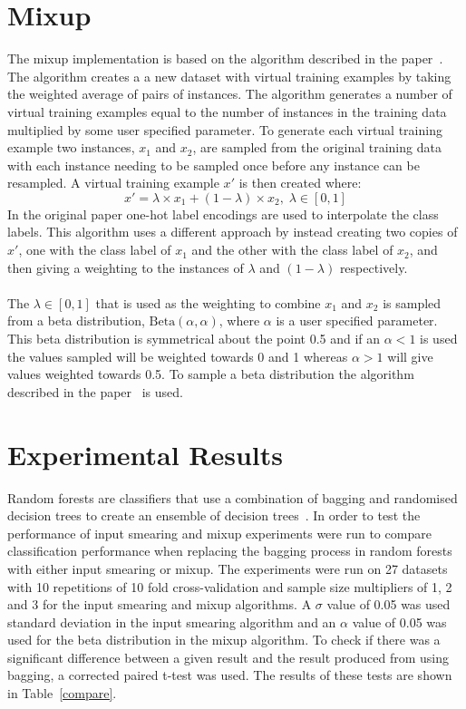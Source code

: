 \documentclass{article}
\begin{document}
\section{Mixup}

The mixup implementation is based on the algorithm described in the paper~\cite{mixup}. The algorithm creates a a new dataset with virtual training examples by taking the weighted average of pairs of instances. The algorithm generates a number of virtual training examples equal to the number of instances in the training data multiplied by some user specified parameter. To generate each virtual training example two instances, $x_1$ and $x_2$, are sampled from the original training data with each instance needing to be sampled once before any instance can be resampled. A virtual training example $x'$ is then created where:
\[
x' = \lambda \times x_1 + (1- \lambda) \times x_2, \; \lambda \in [0,1]
\]
In the original paper one-hot label encodings are used to interpolate the class labels. This algorithm uses a different approach by instead creating two copies of $x'$, one with the class label of $x_1$ and the other with the class label of $x_2$, and then giving a weighting to the instances of $\lambda$ and $(1 - \lambda)$ respectively.

\paragraph{}

The $\lambda \in [0,1]$ that is used as the weighting to combine $x_1$ and $x_2$ is sampled from a beta distribution, $\mathrm{Beta}(\alpha, \alpha)$, where $\alpha$ is a user specified parameter. This beta distribution is symmetrical about the point 0.5 and if an $\alpha < 1$ is used the values sampled will be weighted towards 0 and 1 whereas $\alpha > 1$ will give values weighted towards 0.5. To sample a beta distribution the algorithm described in the paper~\cite{beta} is used.

\section{Experimental Results}

Random forests are classifiers that use a combination of bagging and randomised decision trees to create an ensemble of decision trees~\cite{forest}. In order to test the performance of input smearing and mixup experiments were run to compare classification performance when replacing the bagging process in random forests with either input smearing or mixup. The experiments were run on 27 datasets with 10 repetitions of 10 fold cross-validation and sample size multipliers of 1, 2 and 3 for the input smearing and mixup algorithms. A $\sigma$ value of 0.05 was used standard deviation in the input smearing algorithm and an $\alpha$ value of 0.05 was used for the beta distribution in the mixup algorithm. To check if there was a significant difference between a given result and the result produced from using bagging, a corrected paired t-test was used. The results of these tests are shown in Table~\ref{compare}.
\end{document}
